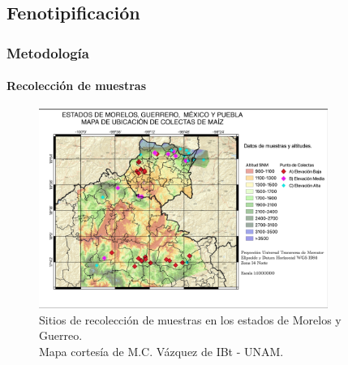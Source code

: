 \documentclass[9pt,aspectratio=169]{beamer}
\begin{document}
\subsection{Fenotipificación}
\begin{frame}
    \frametitle{Metodología}
    \framesubtitle{Recolección de muestras}
    \begin{figure}
        \centering
        \includegraphics[height=65mm]{mapa.png}
        \caption{Sitios de recolección de muestras en los estados de Morelos y Guerreo.\\ Mapa cortesía de M.C. Vázquez de IBt - UNAM.}
        \label{fig:mapa}
    \end{figure}
\end{frame}
\end{document}
